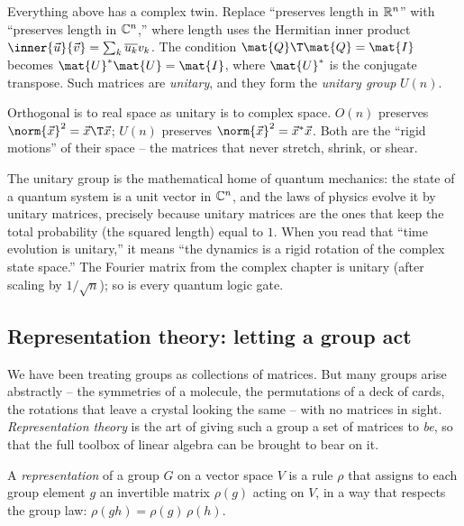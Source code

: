 Everything above has a complex twin. Replace ``preserves length in $\mathbb{R}^n$'' with
``preserves length in $\mathbb{C}^n$,'' where length uses the Hermitian inner product
$\inner{\vec{u}}{\vec{v}} = \sum_k \overline{u_k} v_k$. The condition
$\mat{Q}\T\mat{Q}=\mat{I}$ becomes $\mat{U}^{*}\mat{U}=\mat{I}$, where $\mat{U}^{*}$
is the conjugate transpose. Such matrices are \emph{unitary}, and they form the
\emph{unitary group} $U(n)$.

\begin{focusbox}
Orthogonal is to real space as unitary is to complex space. $O(n)$ preserves
$\norm{\vec{x}}^2 = \vec{x}\T\vec{x}$; $U(n)$ preserves $\norm{\vec{x}}^2 =
\vec{x}^{*}\vec{x}$. Both are the ``rigid motions'' of their space -- the matrices
that never stretch, shrink, or shear.
\end{focusbox}

The unitary group is the mathematical home of quantum mechanics: the state of a
quantum system is a unit vector in $\mathbb{C}^n$, and the laws of physics evolve it by
unitary matrices, precisely because unitary matrices are the ones that keep the
total probability (the squared length) equal to $1$. When you read that ``time
evolution is unitary,'' it means ``the dynamics is a rigid rotation of the complex
state space.'' The Fourier matrix from the complex chapter is unitary (after
scaling by $1/\sqrt{n}$); so is every quantum logic gate.

\subsection{Representation theory: letting a group act}
\label{ch37:reps}

We have been treating groups as collections of matrices. But many groups arise
abstractly -- the symmetries of a molecule, the permutations of a deck of cards,
the rotations that leave a crystal looking the same -- with no matrices in sight.
\emph{Representation theory} is the art of giving such a group a set of matrices to
\emph{be}, so that the full toolbox of linear algebra can be brought to bear on it.

\begin{definition}[Representation]
\label{ch37:def-rep}
A \emph{representation} of a group $G$ on a vector space $V$ is a rule
$\rho$ that assigns to each group element $g$ an invertible matrix $\rho(g)$ acting
on $V$, in a way that respects the group law:
$\rho(g h) = \rho(g)\,\rho(h)$.
\end{definition}

